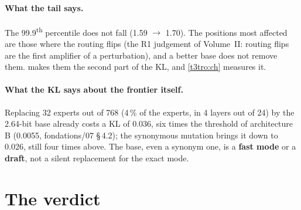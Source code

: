 \paragraph{What the tail says.} The 99.9\textsuperscript{th} percentile does not fall (1.59 $\to$ 1.70). The positions most affected are those where the routing flips (the R1 judgement of Volume~II: routing flips are the first amplifier of a perturbation), and a better base does not remove them.  makes them the second part of the KL, and \cref{t3tro:ch} measures it.

\paragraph{What the KL says about the frontier itself.} Replacing 32 experts out of 768 (4\,\% of the experts, in 4 layers out of 24) by the 2.64-bit base already costs a KL of 0.036, six times the threshold of architecture B (0.0055, fondations/07 §\,4.2); the synonymous mutation brings it down to 0.026, still four times above. The base, even a synonym one, is a \textbf{fast mode} or a \textbf{draft}, not a silent replacement for the exact mode.

\section{The verdict}\label{t3ecl:sec:verdict}

